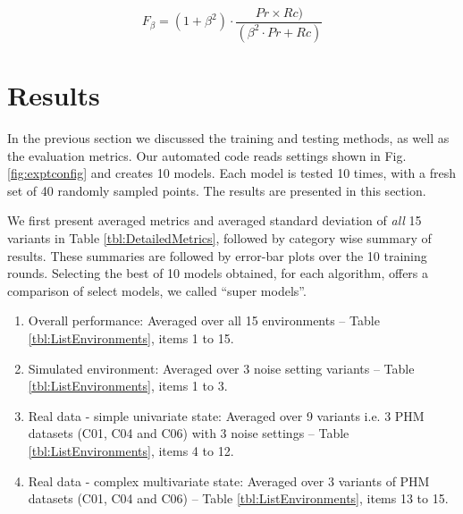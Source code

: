 \documentclass[a4paper, 12pt]{article}
\begin{document}
\begin{equation}
	F_{\beta} = (1+\beta^2) \cdot \frac{Pr \times Rc)}{(\beta^2 \cdot Pr + Rc)}
	\label{eq:Fbeta}
\end{equation}

%	

\section{Results}\label{sec:Results}
In the previous section we discussed the training and testing methods, as well as the evaluation metrics. Our automated code reads settings shown in Fig. \ref{fig:exptconfig} and creates 10 models. Each model is tested 10 times, with a fresh set of 40 randomly sampled points. The results are presented in this section.

We first present averaged metrics and averaged standard deviation of \textit{all} 15 variants in Table \ref{tbl:DetailedMetrics}, followed by category wise summary of results. These summaries are followed by error-bar plots over the 10 training rounds. Selecting the best of 10 models obtained, for each algorithm, offers a comparison of select models, we called ``super models''. 

\begin{enumerate}
	\item Overall performance: Averaged over all 15 environments -- Table \ref{tbl:ListEnvironments}, items 1 to 15.
	\item Simulated environment: Averaged over 3 noise setting variants -- Table \ref{tbl:ListEnvironments}, items 1 to 3.
	\item Real data - simple univariate state: Averaged over 9 variants i.e. 3 PHM datasets (C01, C04 and C06) with 3 noise settings -- Table \ref{tbl:ListEnvironments}, items 4 to 12. 
	\item Real data - complex multivariate state: Averaged over 3 variants of PHM datasets (C01, C04 and C06) -- Table \ref{tbl:ListEnvironments}, items 13 to 15. 
\end{enumerate}
\end{document}
